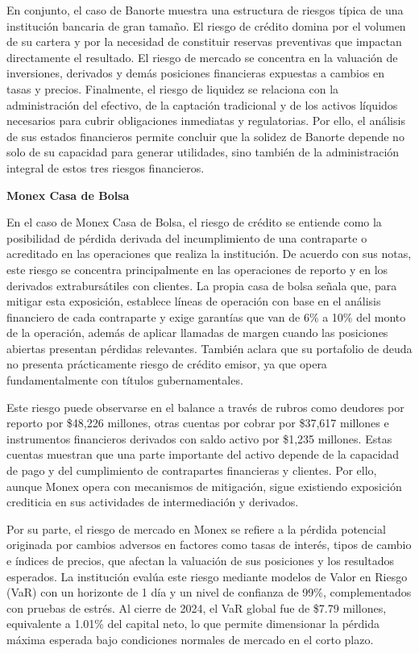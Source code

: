 En conjunto, el caso de Banorte muestra una estructura de riesgos t\'ipica de una instituci\'on bancaria de gran tama\~no. El riesgo de cr\'edito domina por el volumen de su cartera y por la necesidad de constituir reservas preventivas que impactan directamente el resultado. El riesgo de mercado se concentra en la valuaci\'on de inversiones, derivados y dem\'as posiciones financieras expuestas a cambios en tasas y precios. Finalmente, el riesgo de liquidez se relaciona con la administraci\'on del efectivo, de la captaci\'on tradicional y de los activos l\'iquidos necesarios para cubrir obligaciones inmediatas y regulatorias. Por ello, el an\'alisis de sus estados financieros permite concluir que la solidez de Banorte depende no solo de su capacidad para generar utilidades, sino tambi\'en de la administraci\'on integral de estos tres riesgos financieros.

\newpage
\textbf{Monex Casa de Bolsa}

En el caso de Monex Casa de Bolsa, el riesgo de cr\'edito se entiende como la posibilidad de p\'erdida derivada del incumplimiento de una contraparte o acreditado en las operaciones que realiza la instituci\'on. De acuerdo con sus notas, este riesgo se concentra principalmente en las operaciones de reporto y en los derivados extraburs\'atiles con clientes. La propia casa de bolsa se\~nala que, para mitigar esta exposici\'on, establece l\'ineas de operaci\'on con base en el an\'alisis financiero de cada contraparte y exige garant\'ias que van de 6\% a 10\% del monto de la operaci\'on, adem\'as de aplicar llamadas de margen cuando las posiciones abiertas presentan p\'erdidas relevantes. Tambi\'en aclara que su portafolio de deuda no presenta pr\'acticamente riesgo de cr\'edito emisor, ya que opera fundamentalmente con t\'itulos gubernamentales.

Este riesgo puede observarse en el balance a trav\'es de rubros como deudores por reporto por \$48{,}226 millones, otras cuentas por cobrar por \$37{,}617 millones e instrumentos financieros derivados con saldo activo por \$1{,}235 millones. Estas cuentas muestran que una parte importante del activo depende de la capacidad de pago y del cumplimiento de contrapartes financieras y clientes. Por ello, aunque Monex opera con mecanismos de mitigaci\'on, sigue existiendo exposici\'on crediticia en sus actividades de intermediaci\'on y derivados.

Por su parte, el riesgo de mercado en Monex se refiere a la p\'erdida potencial originada por cambios adversos en factores como tasas de inter\'es, tipos de cambio e \'indices de precios, que afectan la valuaci\'on de sus posiciones y los resultados esperados. La instituci\'on eval\'ua este riesgo mediante modelos de Valor en Riesgo (VaR) con un horizonte de 1 d\'ia y un nivel de confianza de 99\%, complementados con pruebas de estr\'es. Al cierre de 2024, el VaR global fue de \$7.79 millones, equivalente a 1.01\% del capital neto, lo que permite dimensionar la p\'erdida m\'axima esperada bajo condiciones normales de mercado en el corto plazo.

